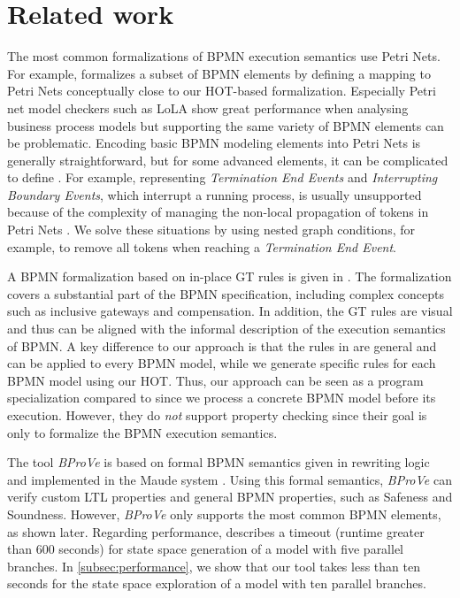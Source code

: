 \documentclass{lmcs} %
\begin{document}
\section{Related work} \label{sec:relatedWork}
The most common formalizations of BPMN execution semantics use Petri Nets.
For example, \cite{dijkmanSemanticsAnalysisBusiness2008} formalizes a subset of BPMN elements by defining a mapping to Petri Nets conceptually close to our HOT-based formalization.
Especially Petri net model checkers such as LoLA show great performance when analysing business process models \cite{fahlandAnalysisDemandInstantaneous2011} but supporting the same variety of BPMN elements can be problematic.
Encoding basic BPMN modeling elements into Petri Nets is generally straightforward, but for some advanced elements, it can be complicated to define \cite{hofstedeWorkflowPatternsExpressive2002}.
For example, representing \textit{Termination End Events} and \textit{Interrupting Boundary Events}, which interrupt a running process, is usually unsupported because of the complexity of managing the non-local propagation of tokens in Petri Nets \cite{corradiniFormalApproachAnalysis2021}.
We solve these situations by using nested graph conditions, for example, to remove all tokens when reaching a \textit{Termination End Event}.
 
A BPMN formalization based on in-place GT rules is given in \cite{vangorpVisualTokenbasedFormalization2013}.
The formalization covers a substantial part of the BPMN specification, including complex concepts such as inclusive gateways and compensation.
In addition, the GT rules are visual and thus can be aligned with the informal description of the execution semantics of BPMN.
A key difference to our approach is that the rules in \cite{vangorpVisualTokenbasedFormalization2013} are general and can be applied to every BPMN model, while we generate specific rules for each BPMN model using our HOT.
Thus, our approach can be seen as a program specialization compared to \cite{vangorpVisualTokenbasedFormalization2013} since we process a concrete BPMN model before its execution.
However, they do \textit{not} support property checking since their goal is only to formalize the BPMN execution semantics.

The tool \textit{BProVe} is based on formal BPMN semantics given in rewriting logic and implemented in the Maude system \cite{corradiniFormalApproachAnalysis2021}.
Using this formal semantics, \textit{BProVe} can verify custom LTL properties and general BPMN properties, such as Safeness and Soundness.
However, \textit{BProVe} only supports the most common BPMN elements, as shown later.
Regarding performance, \cite{corradiniFormalApproachAnalysis2021} describes a timeout (runtime greater than 600 seconds) for state space generation of a model with five parallel branches.
In \autoref{subsec:performance}, we show that our tool takes less than ten seconds for the state space exploration of a model with ten parallel branches.
\end{document}

